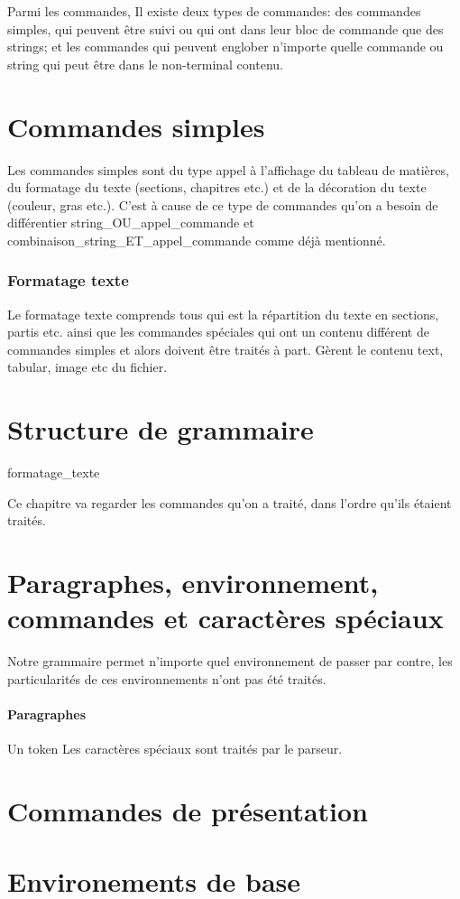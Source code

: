 \documentclass{report}
\begin{document}
Parmi les commandes, Il existe deux types de commandes: des commandes simples, qui peuvent être suivi ou qui ont dans leur bloc de commande que des strings; et les commandes qui peuvent englober n'importe quelle commande ou string qui peut être dans le non-terminal contenu.

\section{Commandes simples}
Les commandes simples sont du type appel à l'affichage du tableau de matières, du formatage du texte (sections, chapitres etc.) et de la décoration du texte (couleur, gras etc.).
C'est à cause de ce type de commandes qu'on a besoin de différentier string_OU_appel_commande et combinaison_string_ET_appel_commande comme déjà mentionné.

\subsubsection{Formatage texte}
Le formatage texte comprends tous qui est la répartition du texte en sections, partis etc. ainsi que les commandes spéciales qui ont un contenu différent de commandes simples et alors doivent être traités à part.
Gèrent le contenu text, tabular, image etc du fichier.

\section{Structure de grammaire}
formatage_texte
  
Ce chapitre va regarder les commandes qu'on a traité, dans l'ordre qu'ils étaient traités.
\section{Paragraphes, environnement, commandes et caractères spéciaux}
Notre grammaire permet n'importe quel environnement de passer par contre, les particularités de ces environnements n'ont pas été traités.
\paragraph{Paragraphes} Un token 
Les caractères spéciaux sont traités par le parseur.
\section{Commandes de présentation}
\section{Environements de base}
\end{document}
